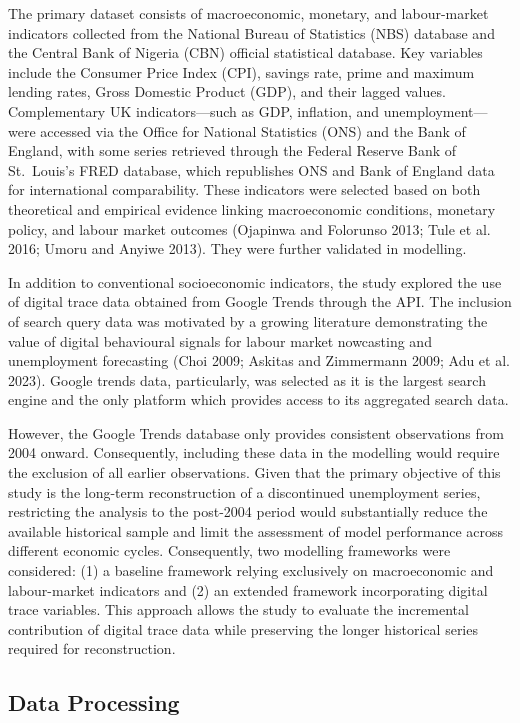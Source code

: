 \documentclass[
  letterpaper,
  DIV=11,
  numbers=noendperiod]{scrartcl}
\begin{document}
The primary dataset consists of macroeconomic, monetary, and
labour-market indicators collected from the National Bureau of
Statistics (NBS) database and the Central Bank of Nigeria (CBN) official
statistical database. Key variables include the Consumer Price Index
(CPI), savings rate, prime and maximum lending rates, Gross Domestic
Product (GDP), and their lagged values. Complementary UK
indicators---such as GDP, inflation, and unemployment---were accessed
via the Office for National Statistics (ONS) and the Bank of England,
with some series retrieved through the Federal Reserve Bank of
St.~Louis's FRED database, which republishes ONS and Bank of England
data for international comparability. These indicators were selected
based on both theoretical and empirical evidence linking macroeconomic
conditions, monetary policy, and labour market outcomes (Ojapinwa and
Folorunso 2013; Tule et al. 2016; Umoru and Anyiwe 2013). They were
further validated in modelling.

In addition to conventional socioeconomic indicators, the study explored
the use of digital trace data obtained from Google Trends through the
API. The inclusion of search query data was motivated by a growing
literature demonstrating the value of digital behavioural signals for
labour market nowcasting and unemployment forecasting (Choi 2009;
Askitas and Zimmermann 2009; Adu et al. 2023). Google trends data,
particularly, was selected as it is the largest search engine and the
only platform which provides access to its aggregated search data.

However, the Google Trends database only provides consistent
observations from 2004 onward. Consequently, including these data in the
modelling would require the exclusion of all earlier observations. Given
that the primary objective of this study is the long-term reconstruction
of a discontinued unemployment series, restricting the analysis to the
post-2004 period would substantially reduce the available historical
sample and limit the assessment of model performance across different
economic cycles. Consequently, two modelling frameworks were considered:
(1) a baseline framework relying exclusively on macroeconomic and
labour-market indicators and (2) an extended framework incorporating
digital trace variables. This approach allows the study to evaluate the
incremental contribution of digital trace data while preserving the
longer historical series required for reconstruction.

\subsection{Data Processing}\label{data-processing}
\end{document}
